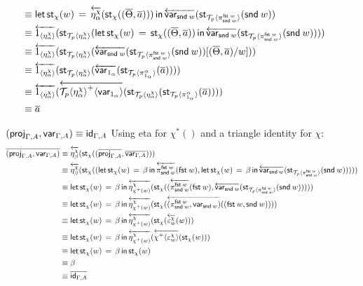 \documentclass[10pt]{article}
\theoremstyle{definition}
\newcommand\dsd[1]{\ensuremath{\mathsf{#1}}}
\newcommand{\app}[2]{\ensuremath{#1 \: #2}}
\newcommand{\fst}[1]{\app{\dsd{fst}}{#1}}
\newcommand{\snd}[1]{\app{\dsd{snd}}{#1}}
\newcommand{\id}{\mathsf{id}}
\newcommand{\rewrite}[2]{\overleftarrow{#1}(#2)}
\newcommand\St[2]{\ensuremath{{#1}^*(#2)}}
\newcommand\StI[2]{\ensuremath{\mathsf{st}_{#1}(#2)}}
\newcommand\StE[4]{\ensuremath{\mathsf{let} \, \StI{#1}{#3} \, = \, {#2} \, \mathsf{in} \, #4}}
\newcommand\TrPlus[2]{\ensuremath{{#1}^+(#2)}}
\newcommand\ApEl[2]{\mathcal{T}_{#1}\langle#2\rangle}
\newcommand\ApPlus[2]{\ensuremath{{#1}^+ \langle #2 \rangle }}
\begin{document}
\begin{enumerate}[style = multiline, labelwidth = 80pt]
\begin{align*}
&\equiv \StE{\chi}{\rewrite{\eta^\chi_{\alpha}}{\StI{\chi}{(\upstairs{\Theta}, \upstairs{a})}}}{w}{\rewrite{\var{\snd w}}{\StI{\ApEl{p}{\pi^{\fst w}_{\snd w}}}{\snd w}}} \\
&\equiv \rewrite{1_{\langle \eta^\chi_\alpha \rangle}}{\StI{\ApEl{p}{\eta^\chi_\alpha}}{\StE{\chi}{\StI{\chi}{(\upstairs{\Theta}, \upstairs{a})}}{w}{\rewrite{\var{\snd w}}{\StI{\ApEl{p}{\pi^{\fst w}_{\snd w}}}{\snd w}}}}} \\
&\equiv \rewrite{1_{\langle \eta^\chi_\alpha \rangle}}{\StI{\ApEl{p}{\eta^\chi_\alpha}}{\rewrite{\var{\snd w}}{\StI{\ApEl{p}{\pi^{\fst w}_{\snd w}}}{\snd w}}[(\upstairs{\Theta}, \upstairs{a})/w]}} \\
&\equiv \rewrite{1_{\langle \eta^\chi_\alpha \rangle}}{\StI{\ApEl{p}{\eta^\chi_\alpha}}{\rewrite{\var{1_\alpha}}{\StI{\ApEl{p}{\pi^{\alpha}_{1_\alpha}}}{\upstairs{a}}}}} \\
&\equiv \rewrite{1_{\langle \eta^\chi_\alpha \rangle}}{\rewrite{\ApPlus{\ApEl{p}{\eta^\chi_\alpha}}{\var{1_\alpha}}}{\StI{\ApEl{p}{\eta^\chi_\alpha}}{\StI{\ApEl{p}{\pi^{\alpha}_{1_\alpha}}}{\upstairs{a}}}}} \\
&\equiv \upstairs{a}
\end{align*}
\item[{$(\proj{\Gamma,A}, \var{\Gamma,A}) \equiv \id_{\Gamma, A}$}] Using eta for $\St{\chi}{}$ and a triangle identity for $\chi$:
\begin{align*}
\upstairs{(\proj{\Gamma,A}, \var{\Gamma,A})}
&\equiv \rewrite{\eta^\chi_{\beta}}{\StI{\chi}{(\upstairs{\proj{\Gamma,A}}, \upstairs{\var{\Gamma,A}})}} \\
&\equiv \rewrite{\eta^\chi_{\beta}}{\StI{\chi}{(\StE{\chi}{\beta}{w}{\rewrite{\pi^{\fst w}_{\snd w}}{\fst w}}, \StE{\chi}{\beta}{w}{\rewrite{\var{\snd w}}{\StI{\ApEl{p}{\pi^{\fst w}_{\snd w}}}{\snd w}}})}} \\
&\equiv \StE{\chi}{\beta}{w}{\rewrite{\eta^\chi_{\TrPlus{\chi}{w}}}{\StI{\chi}{(\rewrite{\pi^{\fst w}_{\snd w}}{\fst w}, \rewrite{\var{\snd w}}{\StI{\ApEl{p}{\pi^{\fst w}_{\snd w}}}{\snd w}})}}} \\
&\equiv \StE{\chi}{\beta}{w}{\rewrite{\eta^\chi_{\TrPlus{\chi}{w}}}{\StI{\chi}{\rewrite{(\pi^{\fst w}_{\snd w},\var{\snd w})}{(\fst w, \snd w)}}}} \\
&\equiv \StE{\chi}{\beta}{w}{\rewrite{\eta^\chi_{\TrPlus{\chi}{w}}}{\StI{\chi}{\rewrite{\varepsilon^\chi_w}{w}}}} \\
&\equiv \StE{\chi}{\beta}{w}{\rewrite{\eta^\chi_{\TrPlus{\chi}{w}}}{\rewrite{\ApPlus{\chi}{\varepsilon^\chi_w}}{\StI{\chi}{w}}}} \\
&\equiv \StE{\chi}{\beta}{w}{\StI{\chi}{w}} \\
&\equiv \beta \\
&\equiv \upstairs{\id_{\Gamma, A}}
\end{align*}
\end{enumerate}
\end{document}
